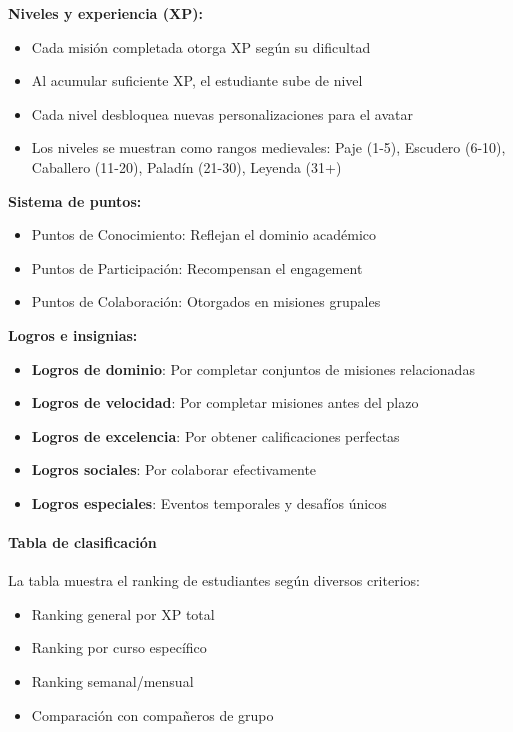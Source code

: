 \textbf{Niveles y experiencia (XP):}

\begin{itemize}
	\item Cada misión completada otorga XP según su dificultad
	\item Al acumular suficiente XP, el estudiante sube de nivel
	\item Cada nivel desbloquea nuevas personalizaciones para el avatar
	\item Los niveles se muestran como rangos medievales: Paje (1-5), Escudero (6-10), Caballero (11-20), Paladín (21-30), Leyenda (31+)
\end{itemize}

\textbf{Sistema de puntos:}

\begin{itemize}
	\item Puntos de Conocimiento: Reflejan el dominio académico
	\item Puntos de Participación: Recompensan el engagement
	\item Puntos de Colaboración: Otorgados en misiones grupales
\end{itemize}

\textbf{Logros e insignias:}

\begin{itemize}
	\item \textbf{Logros de dominio}: Por completar conjuntos de misiones relacionadas
	\item \textbf{Logros de velocidad}: Por completar misiones antes del plazo
	\item \textbf{Logros de excelencia}: Por obtener calificaciones perfectas
	\item \textbf{Logros sociales}: Por colaborar efectivamente
	\item \textbf{Logros especiales}: Eventos temporales y desafíos únicos
\end{itemize}

\paragraph{Tabla de clasificación}

La tabla muestra el ranking de estudiantes según diversos criterios:

\begin{itemize}
	\item Ranking general por XP total
	\item Ranking por curso específico
	\item Ranking semanal/mensual
	\item Comparación con compañeros de grupo
\end{itemize}

